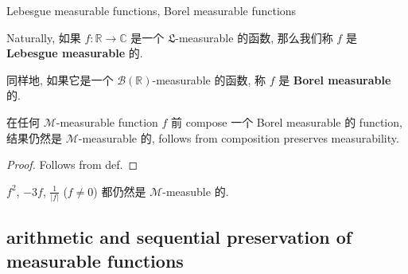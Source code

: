 \documentclass{qlnotes-export}
\begin{document}
\begin{definition}{Lebesgue measurable functions, Borel measurable functions}\label{def-04-measurable-functions-and-integration-on-l-mu-lebesgue-measurable-functions-borel-measurable-functions}

Naturally, 如果 \(f:{\mathbb{R}}\rightarrow{\mathbb{C}}\) 是一个 \(\mathfrak{L}\)-measurable 的函数, 那么我们称 \(f\) 是 \textbf{Lebesgue measurable} 的.

同样地, 如果它是一个 \(\mathcal{B}({\mathbb{R}})\)-measurable 的函数, 称 \(f\) 是 \textbf{Borel measurable} 的.

\end{definition}

\begin{proposition}\label{prop-04-measurable-functions-and-integration-on-l-mu-proposition-003}

在任何 \(\mathcal{M}\)-measurable function \(f\) 前 compose 一个 Borel measurable 的 function, 结果仍然是 \(\mathcal{M}\)-measurable 的, follows from composition preserves measurability.

\end{proposition}

\begin{proof}

Follows from def.

\end{proof}

\begin{example}\label{ex-04-measurable-functions-and-integration-on-l-mu-example-001}

\(f^{2}\), \(- 3f\), \(\frac{1}{|f|}\) (\(f \neq 0\)) 都仍然是 \(\mathcal{M}\)-measuble 的.

\end{example}

\subsection{arithmetic and sequential preservation of measurable functions}\label{arithmetic-and-sequential-preservation-of-measurable-functions}
\end{document}
